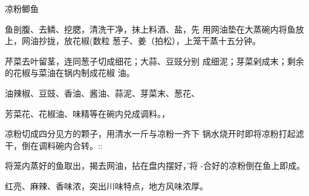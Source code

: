 \begin{recipe}{凉粉鲫鱼}

\ingredients


\cooking

\step 鱼剖腹、去鳞、挖腮，清洗干净，抹上料酒、盐，先 用网油垫在大蒸碗内将鱼放上，网油抄拢，放花椒(数粒 葱子、姜（拍松），上笼干蒸十五分钟。

\step 芹菜去叶留茎，连同葱子切成细花；大蒜、豆豉分别 成细泥；芽菜剁成末；剩余的花椒与菜油在锅内制成花椒
油。

\step 油辣椒、豆豉、香油、酱油、蒜泥、芽菜末、葱花、

芳菜花、花椒油、味精等在碗内兑成调料。，

\step 凉粉切成四分见方的颗子，用清水一斤与凉粉一齐下 锅水烧开时即将凉粉打起滤干，倒在调料碗内合转。::

\step 将笼内蒸好的鱼取出，揭去网油，拈在盘内摆好，’将 -合好的凉粉倒在鱼上即成。

\notes

红亮、麻辣、香味浓，突出川味特点，地方风味浓厚。

\end{recipe}

